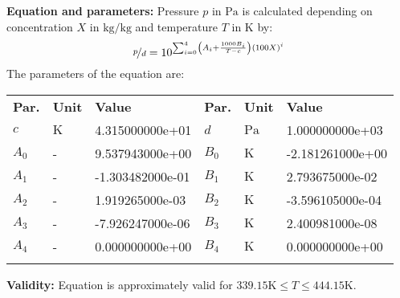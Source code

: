 \textbf{Equation and parameters:}
\newline
%
Pressure $p$ in $\si{\pascal}$ is calculated depending on concentration $X$ in $\si{\kilogram\per\kilogram}$ and  temperature $T$ in $\si{\kelvin}$ by:
%
\begin{equation*}
\nicefrac{p}{d} = 10 ^ { \sum_{i=0}^{4} \left( A_i + \frac{1000 B_i}{T - c} \right) \left( 100 X \right) ^{i}}
\end{equation*}
%
The parameters of the equation are:
%
\begin{longtable}[l]{lll|lll}
\toprule
\addlinespace
\textbf{Par.} & \textbf{Unit} & \textbf{Value} &	\textbf{Par.} & \textbf{Unit} & \textbf{Value} \\
\addlinespace
\midrule
\endhead

\bottomrule
\endfoot
\bottomrule
\endlastfoot
\addlinespace

$c$ & $\si{\kelvin}$ & 4.315000000e+01 & $d$ & $\si{\pascal}$ & 1.000000000e+03 \\
$A_0$ & - & 9.537943000e+00 & $B_0$ & $\si{\kelvin}$ & -2.181261000e+00 \\
$A_1$ & - & -1.303482000e-01 & $B_1$ & $\si{\kelvin}$ & 2.793675000e-02 \\
$A_2$ & - & 1.919265000e-03 & $B_2$ & $\si{\kelvin}$ & -3.596105000e-04 \\
$A_3$ & - & -7.926247000e-06 & $B_3$ & $\si{\kelvin}$ & 2.400981000e-08 \\
$A_4$ & - & 0.000000000e+00 & $B_4$ & $\si{\kelvin}$ & 0.000000000e+00 \\

\addlinespace\end{longtable}

\textbf{Validity:}
\newline
Equation is approximately valid for $339.15 \si{\kelvin} \leq T \leq 444.15 \si{\kelvin}$.
\newline

